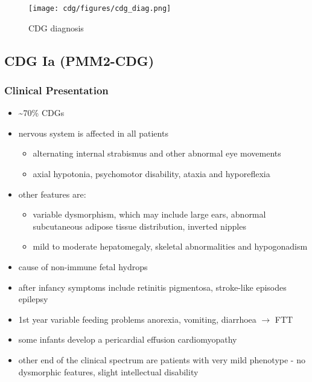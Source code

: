 \documentclass[12pt]{scrartcl}
\begin{document}
\begin{figure}[htbp]
\centering
\texttt{[image: cdg/figures/cdg\_diag.png]}
\caption{\label{fig:orgd34b8ff}CDG diagnosis}
\end{figure}

\subsection{CDG Ia (PMM2-CDG)}
\label{sec:org03df6c3}
\subsubsection{Clinical Presentation}
\label{sec:orgc8697fc}
\begin{itemize}
\item \textasciitilde{}70\% CDGs
\item nervous system is affected in all patients
\begin{itemize}
\item alternating internal strabismus and other abnormal eye movements
\item axial hypotonia, psychomotor disability, ataxia and hyporeflexia
\end{itemize}
\item other features are:
\begin{itemize}
\item variable dysmorphism, which may include large ears, abnormal
subcutaneous adipose tissue distribution, inverted nipples
\item mild to moderate hepatomegaly, skeletal abnormalities and hypogonadism
\end{itemize}
\item cause of non-immune fetal hydrops
\item after infancy symptoms include retinitis pigmentosa, stroke-like episodes \textpm{} epilepsy
\item 1st year variable feeding problems anorexia, vomiting, diarrhoea \(\to\) FTT
\item some infants develop a pericardial effusion \textpm{} cardiomyopathy
\item other end of the clinical spectrum are patients with very mild
phenotype - no dysmorphic features, slight intellectual disability
\end{itemize}
\end{document}
